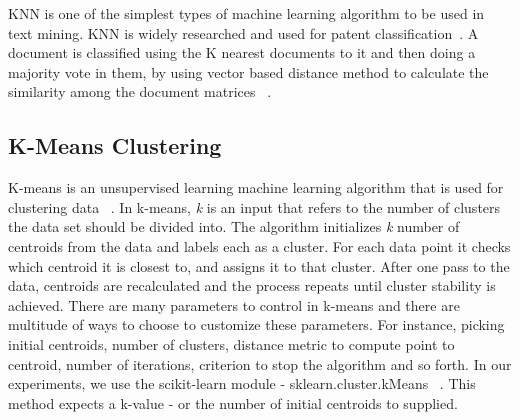 \documentclass[sigconf]{acmart}
\theoremstyle{break}
\begin{document}
    KNN is one of the simplest types of machine learning algorithm to be used in text mining. KNN is widely researched and used for patent classification~\cite{fall2003automated}. A document is classified using the K nearest documents to it and then doing a majority vote in them, by using vector based distance method to calculate the similarity among the document matrices ~\cite{mihalcea2006corpus}.
    
    \subsection{K-Means Clustering}
    \label{sssec:K-Means Clustering}
    K-means is an unsupervised learning machine learning algorithm that is used for clustering data ~\cite{jain2010data}. In k-means, {\em k} is an input that refers to the number of clusters the data set should be divided into. The algorithm initializes {\em k} number of centroids from the data and labels each as a cluster. For each data point it checks which centroid it is closest to, and assigns it to that cluster. After one pass to the data, centroids are recalculated and the process repeats until cluster stability is achieved. There are many parameters to control in k-means and there are multitude of ways to choose to customize these parameters. For instance, picking initial centroids, number of clusters, distance metric to compute point to centroid, number of iterations, criterion to stop the algorithm and so forth. In our experiments, we use the scikit-learn module -  sklearn.cluster.kMeans ~\cite{pedregosa2011scikit}. This method expects a k-value - or the number of initial centroids to supplied.
\end{document}
